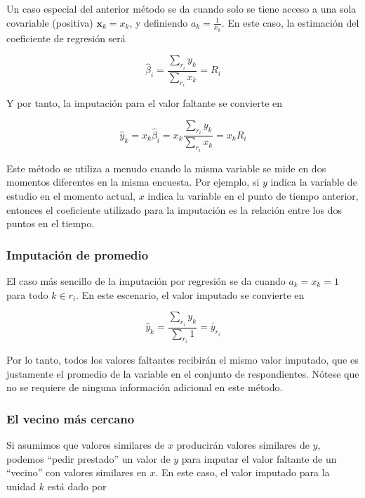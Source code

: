 \documentclass[
  12pt,
  spanish,
]{book}
\begin{document}
Un caso especial del anterior método se da cuando solo se tiene acceso a una sola covariable (positiva) \(\mathbf{x}_k = x_k\), y definiendo \(a_k = \frac{1}{x_k}\). En este caso, la estimación del coeficiente de regresión será

\[
\hat{{\beta}}_i = \frac{\sum_{r_i}y_k}{\sum_{r_i}x_k} = R_i
\]

Y por tanto, la imputación para el valor faltante se convierte en

\[\hat{y}_k = x_k \hat{\beta}_i = x_k \frac{\sum_{r_i}y_k}{\sum_{r_i}x_k} = x_k R_i\]

Este método se utiliza a menudo cuando la misma variable se mide en dos momentos diferentes en la misma encuesta. Por ejemplo, si \(y\) indica la variable de estudio en el momento actual, \(x\) indica la variable en el punto de tiempo anterior, entonces el coeficiente utilizado para la imputación es la relación entre los dos puntos en el tiempo.

\hypertarget{imputaciuxf3n-de-promedio}{%
\subsubsection*{Imputación de promedio}\label{imputaciuxf3n-de-promedio}}

El caso más sencillo de la imputación por regresión se da cuando \(a_k = x_k = 1\) para todo \(k \in r_i\). En este escenario, el valor imputado se convierte en

\[\hat{y}_k  = \frac{\sum_{r_i}y_k}{\sum_{r_i}1}= \bar{y}_{r_i}\]

Por lo tanto, todos los valores faltantes recibirán el mismo valor imputado, que es justamente el promedio de la variable en el conjunto de respondientes. Nótese que no se requiere de ninguna información adicional en este método.

\hypertarget{el-vecino-muxe1s-cercano}{%
\subsubsection*{El vecino más cercano}\label{el-vecino-muxe1s-cercano}}

Si asumimos que valores similares de \(x\) producirán valores similares de \(y\), podemos ``pedir prestado'' un valor de \(y\) para imputar el valor faltante de un ``vecino'' con valores similares en \(x\). En este caso, el valor imputado para la unidad \(k\) está dado por
\end{document}
